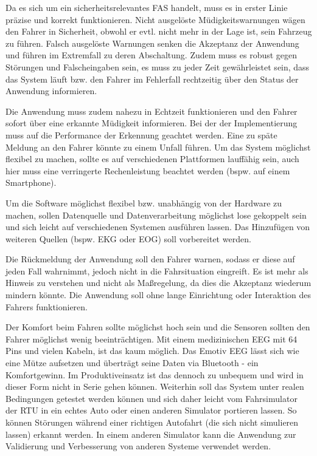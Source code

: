\label{chap:requirements}
Da es sich um ein sicherheitsrelevantes \acl{FAS} handelt, muss es in erster Linie präzise und korrekt funktionieren. Nicht ausgelöste Müdigkeitswarnungen wägen den Fahrer in Sicherheit, obwohl er evtl. nicht mehr in der Lage ist, sein Fahrzeug zu führen. Falsch ausgelöste Warnungen senken die Akzeptanz der Anwendung und führen im Extremfall zu deren   Abschaltung. Zudem muss es robust gegen Störungen und Falscheingaben sein, es muss zu jeder Zeit gewährleistet sein, dass das System läuft bzw. den Fahrer im Fehlerfall rechtzeitig über den Status der Anwendung informieren.

Die Anwendung muss zudem nahezu in Echtzeit funktionieren und den Fahrer sofort über eine erkannte Müdigkeit informieren. Bei der der Implementierung muss auf die Performance der Erkennung geachtet werden. Eine zu späte Meldung an den Fahrer könnte zu einem Unfall führen. Um das System möglichst flexibel zu machen, sollte es auf verschiedenen Plattformen lauffähig sein, auch hier muss eine verringerte Rechenleistung beachtet werden (bspw. auf einem Smartphone).

Um die Software möglichst flexibel bzw. unabhängig von der Hardware zu machen, sollen Datenquelle und Datenverarbeitung möglichst lose gekoppelt sein und sich leicht auf verschiedenen Systemen ausführen lassen. Das Hinzufügen von weiteren Quellen (bspw. EKG oder EOG) soll vorbereitet werden.

Die Rückmeldung der Anwendung soll den Fahrer warnen, sodass er diese auf jeden Fall wahrnimmt, jedoch nicht in die Fahrsituation eingreift. Es ist mehr als Hinweis zu verstehen und nicht als Maßregelung, da dies die Akzeptanz wiederum mindern könnte. Die Anwendung soll ohne lange Einrichtung oder Interaktion des Fahrers funktionieren.

Der Komfort beim Fahren sollte möglichst hoch sein und die Sensoren sollten den Fahrer möglichst wenig beeinträchtigen. Mit einem medizinischen EEG mit 64 Pins und vielen Kabeln, ist das kaum möglich. Das Emotiv EEG lässt sich wie eine Mütze aufsetzen und überträgt seine Daten via Bluetooth - ein Komfortgewinn. Im Produktiveinsatz ist das dennoch zu unbequem und wird in dieser Form nicht in Serie gehen können.
Weiterhin soll das System unter realen Bedingungen getestet werden können und sich daher leicht vom Fahrsimulator der \acl{RTU} in ein echtes Auto oder einen anderen Simulator portieren lassen. So können Störungen während einer richtigen Autofahrt (die sich nicht simulieren lassen) erkannt werden. In einem anderen Simulator kann die Anwendung zur Validierung und Verbesserung von anderen Systeme verwendet werden.


